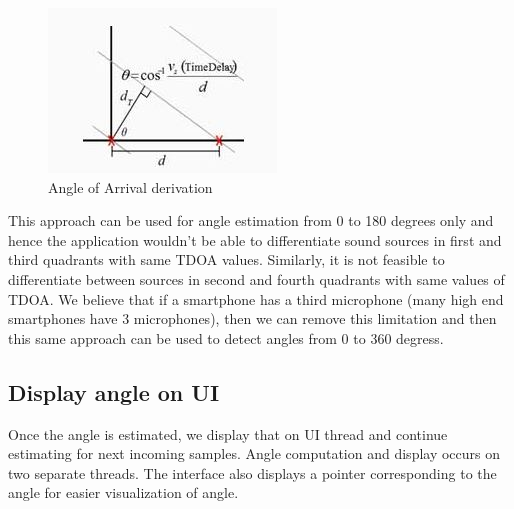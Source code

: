 \begin{figure}
\includegraphics{figures/angle-of-arrival.jpg}
\caption{Angle of Arrival derivation ~\protect\cite{derivationSource}}
\label{fig:aoaDerivation}
\end{figure}

This approach can be used for angle estimation from 0 to 180 degrees only and hence the application wouldn't be able to differentiate sound sources in first and third quadrants with same TDOA values. Similarly, it is not feasible to differentiate between sources in second and fourth quadrants with same values of TDOA. We believe that if a smartphone has a third microphone (many high end smartphones have 3 microphones), then we can remove this limitation and then this same approach can be used to detect angles from 0 to 360 degress.

\subsection{Display angle on UI}
Once the angle is estimated, we display that on UI thread and continue estimating for next incoming samples. Angle computation and display occurs on two separate threads. The interface also displays a pointer corresponding to the angle for easier visualization of angle.
